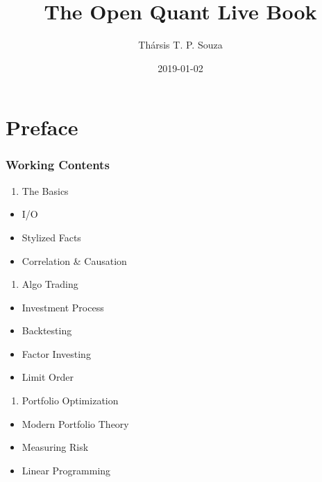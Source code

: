 \documentclass[]{book}
\title{The Open Quant Live Book}
\author{Thársis T. P. Souza}
\date{2019-01-02}
\providecommand{\tightlist}{%
  \setlength{\itemsep}{0pt}\setlength{\parskip}{0pt}}
\begin{document}


\maketitle

{
\hypersetup{linkcolor=}
\setcounter{tocdepth}{1}
\tableofcontents
}
\chapter*{Preface}\label{preface}

\subsection*{Working Contents}\label{working-contents}

\begin{enumerate}
\def\labelenumi{\arabic{enumi}.}
\tightlist
\item
  The Basics
\end{enumerate}

\begin{itemize}
\tightlist
\item
  I/O
\item
  Stylized Facts
\item
  Correlation \& Causation
\end{itemize}

\begin{enumerate}
\def\labelenumi{\arabic{enumi}.}
\setcounter{enumi}{1}
\tightlist
\item
  Algo Trading
\end{enumerate}

\begin{itemize}
\tightlist
\item
  Investment Process
\item
  Backtesting
\item
  Factor Investing
\item
  Limit Order
\end{itemize}

\begin{enumerate}
\def\labelenumi{\arabic{enumi}.}
\setcounter{enumi}{2}
\tightlist
\item
  Portfolio Optimization
\end{enumerate}

\begin{itemize}
\tightlist
\item
  Modern Portfolio Theory
\item
  Measuring Risk
\item
  Linear Programming
\end{itemize}
\end{document}
